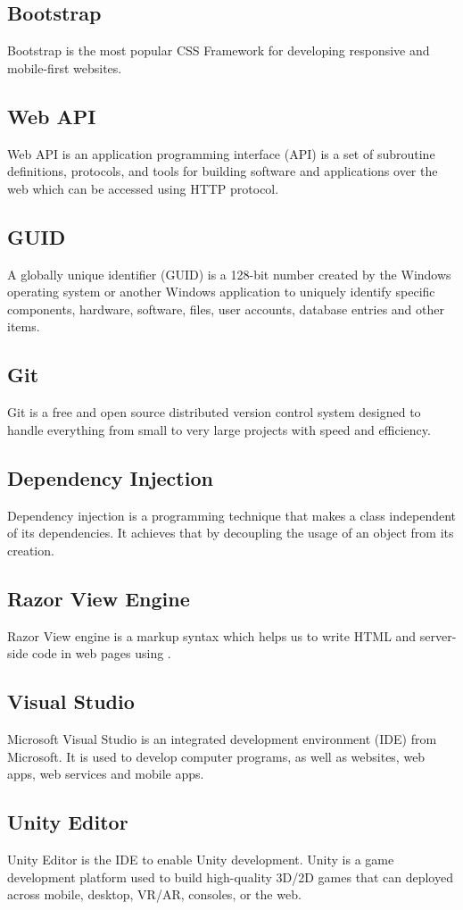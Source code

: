 \subsection*{Bootstrap}
Bootstrap is the most popular CSS Framework for developing responsive and mobile-first websites.
\subsection*{Web API}
Web API is an application programming interface (API) is a set of subroutine definitions, protocols, and tools for building software and applications over the web which can be accessed using HTTP protocol.
\subsection*{GUID}
A globally unique identifier (GUID) is a 128-bit number created by the Windows operating system or another Windows application to uniquely identify specific components, hardware, software, files, user accounts, database entries and other items.
\subsection*{Git}
Git is a free and open source distributed version control system designed to handle everything from small to very large projects with speed and efficiency.
\subsection*{Dependency Injection}
Dependency injection is a programming technique that makes a class independent of its dependencies. It achieves that by decoupling the usage of an object from its creation.
\subsection*{Razor View Engine}
Razor View engine is a markup syntax which helps us to write HTML and server-side code in web pages using \C.
\subsection*{Visual Studio}
Microsoft Visual Studio is an integrated development environment (IDE) from Microsoft. It is used to develop computer programs, as well as websites, web apps, web services and mobile apps.
\subsection*{Unity Editor}
 Unity Editor is the IDE to enable Unity development. Unity is a game development platform used to build high-quality 3D/2D games that can deployed across mobile, desktop, VR/AR, consoles, or the web.
